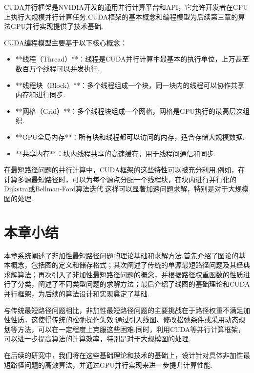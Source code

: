 CUDA并行框架是NVIDIA开发的通用并行计算平台和API，它允许开发者在GPU上执行大规模并行计算任务.CUDA框架的基本概念和编程模型为后续第三章的算法GPU并行实现提供了技术基础.

CUDA编程模型主要基于以下核心概念：
\begin{itemize}
  \item **线程（Thread）**：线程是CUDA并行计算中最基本的执行单位，上万甚至数百万个线程可以并发执行.
  \item **线程块（Block）**：多个线程组成一个块，同一块内的线程可以协作共享内存和进行同步.
  \item **网格（Grid）**：多个线程块组成一个网格，网格是GPU执行的最高层次组织.
  \item **GPU全局内存**：所有块和线程都可以访问的内存，适合存储大规模数据.
  \item **共享内存**：块内线程共享的高速缓存，用于线程间通信和同步.
\end{itemize}

在最短路径问题的并行计算中，CUDA框架的这些特性可以被充分利用.例如，在计算多源最短路径时，可以为每个源点分配一个线程块，在块内进行并行化的Dijkstra或Bellman-Ford算法迭代.这样可以显著加速问题求解，特别是对于大规模图的处理.

\section{本章小结}

本章系统阐述了非加性最短路径问题的理论基础和求解方法.首先介绍了图论的基本概念，包括图的定义和储存格式；其次阐述了传统的单源最短路径问题及其经典求解算法；再次引入了非加性最短路径问题的概念，并根据路径权重函数的性质进行了分类，阐述了不同类型问题的求解方法；最后介绍了线图的基础理论和CUDA并行框架，为后续的算法设计和实现奠定了基础.

与传统最短路径问题相比，非加性最短路径问题的主要挑战在于路径权重不满足加性性质，这使得传统的松弛操作失效.通过引入线图、修改松弛条件或采用动态规划等方法，可以在一定程度上克服这些困难.同时，利用CUDA等并行计算框架，可以进一步提高算法的计算效率，特别是对于大规模图的处理.

在后续的研究中，我们将在这些基础理论和技术的基础上，设计针对具体非加性最短路径问题的高效算法，并通过GPU并行实现来进一步提升计算性能.
